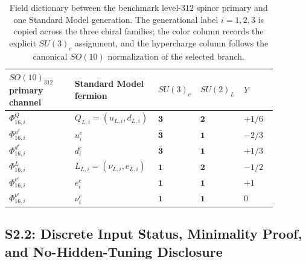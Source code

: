 \documentclass[11pt]{article}
\begin{document}
\begin{table}[t]
\centering
\small
{\setlength{\tabcolsep}{4pt}
\begin{tabular}{@{}>{\raggedright\arraybackslash}p{0.24\linewidth}>{\raggedright\arraybackslash}p{0.28\linewidth}>{\centering\arraybackslash}p{0.12\linewidth}>{\centering\arraybackslash}p{0.12\linewidth}>{\centering\arraybackslash}p{0.12\linewidth}@{}}
\hline
$SO(10)_{312}$ primary channel & Standard Model fermion & $SU(3)_c$ & $SU(2)_L$ & $Y$ \\
\hline
$\Phi_{16,i}^{Q}$ & $Q_{L,i}=(u_{L,i},d_{L,i})$ & $\mathbf{3}$ & $\mathbf{2}$ & $+1/6$ \\
$\Phi_{16,i}^{u^c}$ & $u^c_i$ & $\bar{\mathbf{3}}$ & $\mathbf{1}$ & $-2/3$ \\
$\Phi_{16,i}^{d^c}$ & $d^c_i$ & $\bar{\mathbf{3}}$ & $\mathbf{1}$ & $+1/3$ \\
$\Phi_{16,i}^{L}$ & $L_{L,i}=(\nu_{L,i},e_{L,i})$ & $\mathbf{1}$ & $\mathbf{2}$ & $-1/2$ \\
$\Phi_{16,i}^{e^c}$ & $e^c_i$ & $\mathbf{1}$ & $\mathbf{1}$ & $+1$ \\
$\Phi_{16,i}^{\nu^c}$ & $\nu^c_i$ & $\mathbf{1}$ & $\mathbf{1}$ & $0$ \\
\hline
\end{tabular}}
\caption{Field dictionary between the benchmark level-$312$ spinor primary and one Standard Model generation. The generational label $i=1,2,3$ is copied across the three chiral families; the color column records the explicit $SU(3)_c$ assignment, and the hypercharge column follows the canonical $SO(10)$ normalization of the selected branch.}
\label{tab:s2-wzw-field-dictionary}
\end{table}

\subsection*{S2.2: Discrete Input Status, Minimality Proof, and No-Hidden-Tuning Disclosure}
\end{document}
